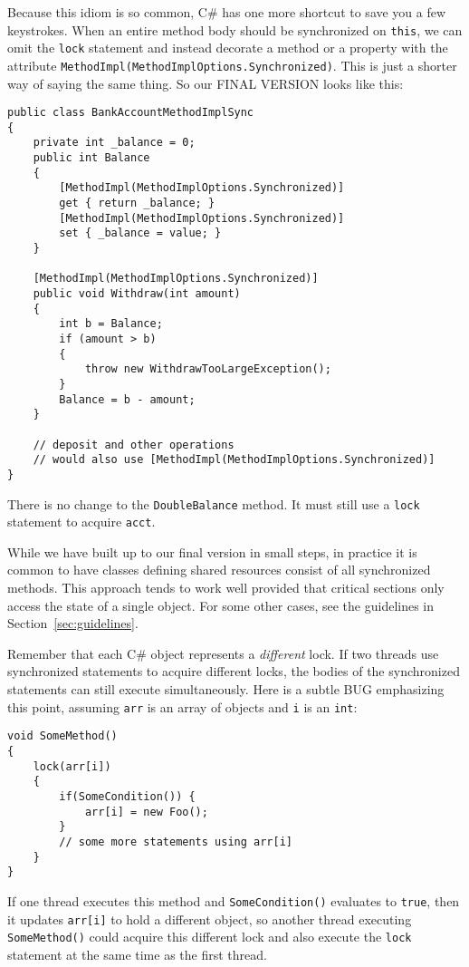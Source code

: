 \documentclass[10pt]{article}
\begin{document}
Because this idiom is so common, C\# has one more shortcut to save
you a few keystrokes.  When an entire method body should be
synchronized on {\tt this}, we can omit the {\tt lock} statement and
instead decorate a method or a property with the attribute 
{\tt MethodImpl(MethodImplOptions.Synchronized)}.  This is just a shorter 
way of saying the same thing.  So our FINAL VERSION looks like this:
\begin{verbatim}
public class BankAccountMethodImplSync
{
    private int _balance = 0;
    public int Balance
    {
        [MethodImpl(MethodImplOptions.Synchronized)]
        get { return _balance; }
        [MethodImpl(MethodImplOptions.Synchronized)]
        set { _balance = value; }
    }

    [MethodImpl(MethodImplOptions.Synchronized)]
    public void Withdraw(int amount)
    {
        int b = Balance;
        if (amount > b)
        {
            throw new WithdrawTooLargeException();
        }
        Balance = b - amount;
    }
    
    // deposit and other operations
    // would also use [MethodImpl(MethodImplOptions.Synchronized)]
}
\end{verbatim}
There is no change to the {\tt DoubleBalance} method.  It must still
use a {\tt lock} statement to acquire {\tt acct}.

While we have built up to our final version in small steps, in
practice it is common to have classes defining shared resources
consist of all synchronized methods.  This approach tends to work well
provided that critical sections only access the state of a single
object.  For some other cases, see the guidelines in
Section~\ref{sec:guidelines}.

Remember that each C\# object represents a \emph{different} lock.  If
two threads use synchronized statements to acquire different locks,
the bodies of the synchronized statements can still execute
simultaneously.  Here is a subtle BUG emphasizing this point, assuming
{\tt arr} is an array of objects and {\tt i} is an {\tt int}:
\begin{verbatim}
void SomeMethod()
{
	lock(arr[i])
	{
		if(SomeCondition()) {
		    arr[i] = new Foo();
		}
		// some more statements using arr[i]
	}
}
\end{verbatim}
If one thread executes this method and {\tt SomeCondition()} evaluates
to {\tt true}, then it updates {\tt arr[i]} to hold a different
object, so another thread executing {\tt SomeMethod()} could acquire
this different lock and also execute the {\tt lock} statement at the same
time as the first thread.
\end{document}
